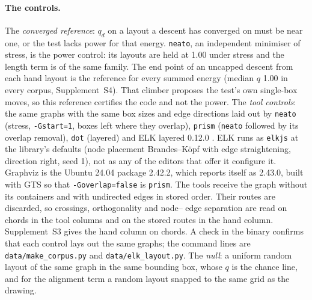 \documentclass[11pt]{article}
\begin{document}
\paragraph{The controls.} The \emph{converged reference}: $q_d$ on a layout a descent
has converged on must be near one, or the test lacks power for that energy.
\texttt{neato}, an independent minimiser of stress, is the power control: its layouts are
held at 1.00 under stress and the length term is of the same family. The end point of an
uncapped descent from each hand layout is the reference for every summed energy (median
$q$ 1.00 in every corpus, Supplement~S4). That climber proposes the test's own single-box
moves, so this reference certifies the code and not the power. The \emph{tool controls}:
the same graphs with the same box sizes and edge directions laid out by \texttt{neato}
(stress, \texttt{-Gstart=1}, boxes left where they overlap), \texttt{prism}
(\texttt{neato} followed by its overlap removal), \texttt{dot} (layered) and ELK layered
0.12.0 \cite{schulze14}. ELK runs as \texttt{elkjs} at the library's defaults (node
placement Brandes--K\"opf with edge straightening, direction right, seed 1), not as any of
the editors that offer it configure it. Graphviz is the Ubuntu 24.04 package 2.42.2, which
reports itself as 2.43.0, built with GTS so that \texttt{-Goverlap=false} is
\texttt{prism}. The tools receive the graph without its containers and with undirected
edges in stored order. Their routes are discarded, so crossings, orthogonality and node--
edge separation are read on chords in the tool columns and on the stored routes in the
hand column. Supplement~S3 gives the hand column on chords. A check in the binary
confirms that each control lays out the same graphs; the command lines are
\texttt{data/make\_corpus.py} and \texttt{data/elk\_layout.py}. The \emph{null}: a uniform random layout of
the same graph in the same bounding box, whose $q$ is the chance line, and for the
alignment term a random layout snapped to the same grid as the drawing.
\end{document}
